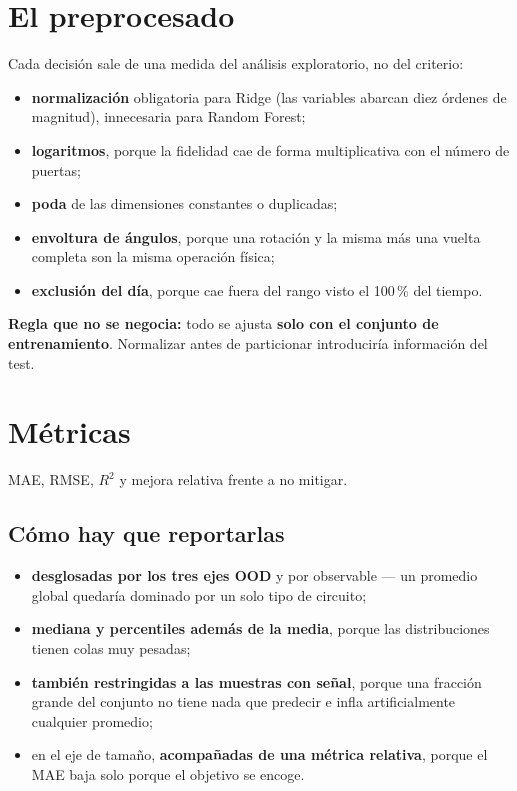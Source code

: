 \section{El preprocesado}
\label{sec:preprocesado}
Cada decisión sale de una medida del análisis exploratorio, no del criterio:
\begin{itemize}
    \item \textbf{normalización} obligatoria para Ridge (las variables abarcan diez órdenes de
          magnitud), innecesaria para Random Forest;
    \item \textbf{logaritmos}, porque la fidelidad cae de forma multiplicativa con el número
          de puertas;
    \item \textbf{poda} de las dimensiones constantes o duplicadas;
    \item \textbf{envoltura de ángulos}, porque una rotación y la misma más una vuelta
          completa son la misma operación física;
    \item \textbf{exclusión del día}, porque cae fuera del rango visto el 100\,\% del tiempo.
\end{itemize}

\textbf{Regla que no se negocia:} todo se ajusta \textbf{solo con el conjunto de
entrenamiento}. Normalizar antes de particionar introduciría información del test.

\section{Métricas}
\label{sec:metricas}
MAE, RMSE, $R^2$ y mejora relativa frente a no mitigar.

\subsection{Cómo hay que reportarlas}
\begin{itemize}
    \item \textbf{desglosadas por los tres ejes OOD} y por observable — un promedio global
          quedaría dominado por un solo tipo de circuito;
    \item \textbf{mediana y percentiles además de la media}, porque las distribuciones tienen
          colas muy pesadas;
    \item \textbf{también restringidas a las muestras con señal}, porque una fracción grande
          del conjunto no tiene nada que predecir e infla artificialmente cualquier promedio;
    \item en el eje de tamaño, \textbf{acompañadas de una métrica relativa}, porque el MAE baja
          solo porque el objetivo se encoge.
\end{itemize}

